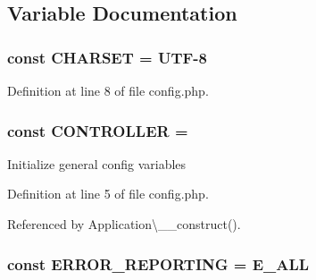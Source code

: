 \subsection{Variable Documentation}
\hypertarget{config_8php_a4ca86066304d2cbb779bd8afd1efe17b}{}
\subsubsection[{C\+H\+A\+R\+S\+E\+T}]{\setlength{\rightskip}{0pt plus 5cm}const C\+H\+A\+R\+S\+E\+T = \textquotesingle{}U\+T\+F-\/8\textquotesingle{}}\label{config_8php_a4ca86066304d2cbb779bd8afd1efe17b}


Definition at line 8 of file config.\+php.

\hypertarget{config_8php_afa55a6839ec4ad32fc00879d78229356}{}
\subsubsection[{C\+O\+N\+T\+R\+O\+L\+L\+E\+R}]{\setlength{\rightskip}{0pt plus 5cm}const C\+O\+N\+T\+R\+O\+L\+L\+E\+R = \textquotesingle{}}\label{config_8php_afa55a6839ec4ad32fc00879d78229356}
Initialize general config variables 

Definition at line 5 of file config.\+php.



Referenced by Application\textbackslash{}\+\_\+\+\_\+construct().

\hypertarget{config_8php_a80c2f40a4ce1ad3cbfb1978239f63c31}{}
\subsubsection[{E\+R\+R\+O\+R\+\_\+\+R\+E\+P\+O\+R\+T\+I\+N\+G}]{\setlength{\rightskip}{0pt plus 5cm}const E\+R\+R\+O\+R\+\_\+\+R\+E\+P\+O\+R\+T\+I\+N\+G = E\+\_\+\+A\+L\+L}\label{config_8php_a80c2f40a4ce1ad3cbfb1978239f63c31}


